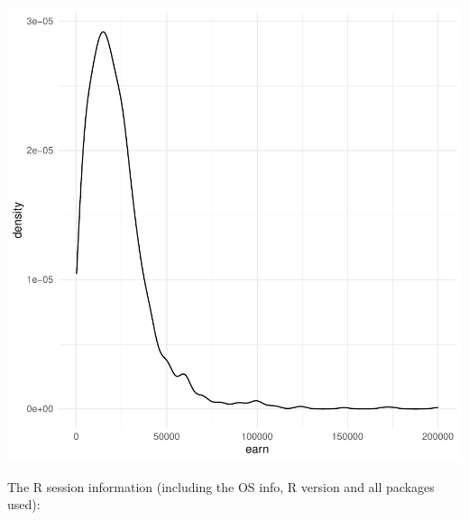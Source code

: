 \documentclass{article}\usepackage[]{graphicx}\usepackage[]{xcolor}
\newenvironment{knitrout}{}{} %
\begin{document}
\begin{knitrout}
{\centering \includegraphics[width=.6\linewidth]{figure/assignment-03-Reppeto-Brian-Rnwauto-report-11} 

}


\end{knitrout}

The R session information (including the OS info, R version and all
packages used):
\end{document}
